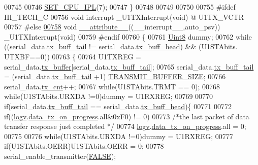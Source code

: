 \begin{DoxyCode}
{{{{{{00745 
00746     \hyperlink{a00013_a34d4c80d85281a545f3c7f1530803d65}{SET\_CPU\_IPL}(7);
00747 \}
00748 
00749 
00750 
00755 \textcolor{preprocessor}{#ifdef HI\_TECH\_C}
00756 \textcolor{keywordtype}{void} interrupt  \_U1TXInterrupt(\textcolor{keywordtype}{void}) @ U1TX\_VCTR
00757 \textcolor{preprocessor}{#else}
\hypertarget{a00028_source_l00758}{}\hyperlink{a00029_af419298e8d3acbb31667796fec870f76}{00758} \textcolor{keywordtype}{void} \hyperlink{a00028_a2068c3c2584547dbc1c8b9bca2d55b18}{\_\_attribute\_\_}((\_\_interrupt\_\_,auto\_psv)) \_U1TXInterrupt(\textcolor{keywordtype}{void})
00759 \textcolor{preprocessor}{#endif}
00760 \{
00761    \hyperlink{a00070_af84840501dec18061d18a68c162a8fa2}{Uint8} dummy;
00762     \textcolor{keywordflow}{while} ((serial\_data.\hyperlink{a00028_a6287e1447d7902b8bbc2f6359065dcbd}{tx\_buff\_tail} != serial\_data.\hyperlink{a00028_a3e2eda0a020422511de91b2bc7386083}{tx\_buff\_head}) && (U1STAbits.
      UTXBF==0))
00763     \{
00764         U1TXREG = serial\_data.\hyperlink{a00028_a327864d2719b5145f0eded883fe321c5}{tx\_buffer}[serial\_data.\hyperlink{a00028_a6287e1447d7902b8bbc2f6359065dcbd}{tx\_buff\_tail}];
00765         serial\_data.\hyperlink{a00028_a6287e1447d7902b8bbc2f6359065dcbd}{tx\_buff\_tail} = (serial\_data.\hyperlink{a00028_a6287e1447d7902b8bbc2f6359065dcbd}{tx\_buff\_tail} +1)%
      \hyperlink{a00029_aef714b16a48390956c10e8aa18d156b8}{TRANSMIT\_BUFFER\_SIZE};
00766         serial\_data.\hyperlink{a00028_ab6b71c720d341035fb26d723364eb879}{tx\_cnt}++;
00767         \textcolor{keywordflow}{while}(U1STAbits.TRMT == 0);
00768         \textcolor{keywordflow}{while}(U1STAbits.URXDA !=0)dummy = U1RXREG;
00769 
00770         \textcolor{keywordflow}{if}(serial\_data.\hyperlink{a00028_a6287e1447d7902b8bbc2f6359065dcbd}{tx\_buff\_tail} == serial\_data.\hyperlink{a00028_a3e2eda0a020422511de91b2bc7386083}{tx\_buff\_head})\{
00771 
00772           \textcolor{keywordflow}{if}((\hyperlink{a00019_a2e89c46668b39a17753c238950c9e1ec}{logv}.\hyperlink{a00019_a6cdefde69642ef511e3252c38be68516}{data\_tx\_on\_progress}.all&0xF0) != 0)
00773               \textcolor{comment}{/*the last packet of data transfer response just completed */}
00774               \hyperlink{a00019_a2e89c46668b39a17753c238950c9e1ec}{logv}.\hyperlink{a00019_a6cdefde69642ef511e3252c38be68516}{data\_tx\_on\_progress}.all = 0;
00775 
00776           \textcolor{keywordflow}{while}(U1STAbits.URXDA !=0)dummy = U1RXREG;
00777           \textcolor{keywordflow}{if}(U1STAbits.OERR)U1STAbits.OERR = 0;
00778           serial\_enable\_transmitter(\hyperlink{a00038_aa93f0eb578d23995850d61f7d61c55c1}{FALSE});
}}}}}}
\end{DoxyCode}
